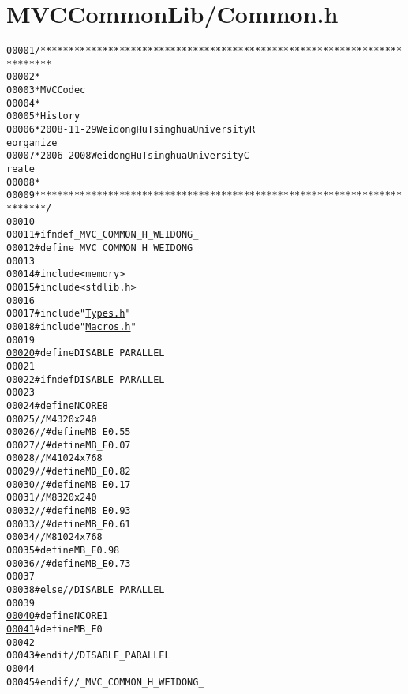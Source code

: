 \hypertarget{_common_8h_source}{
\section{MVCCommonLib/Common.h}
}


\begin{footnotesize}\begin{alltt}
00001 \textcolor{comment}{/************************************************************************}
00002 \textcolor{comment}{ *}
00003 \textcolor{comment}{ * MVC Codec}
00004 \textcolor{comment}{ * }
00005 \textcolor{comment}{ * History}
00006 \textcolor{comment}{ * 2008-11-29           Weidong Hu              Tsinghua University             R
      eorganize}
00007 \textcolor{comment}{ * 2006-2008            Weidong Hu              Tsinghua University             C
      reate}
00008 \textcolor{comment}{ * }
00009 \textcolor{comment}{ ************************************************************************/}
00010 
00011 \textcolor{preprocessor}{#ifndef \_MVC\_COMMON\_H\_WEIDONG\_}
00012 \textcolor{preprocessor}{}\textcolor{preprocessor}{#define \_MVC\_COMMON\_H\_WEIDONG\_}
00013 \textcolor{preprocessor}{}
00014 \textcolor{preprocessor}{#include <memory>}
00015 \textcolor{preprocessor}{#include <stdlib.h>}
00016 
00017 \textcolor{preprocessor}{#include "\hyperlink{_types_8h}{Types.h}"}
00018 \textcolor{preprocessor}{#include "\hyperlink{_macros_8h}{Macros.h}"}
00019 
\hypertarget{_common_8h_source_l00020}{}\hyperlink{_common_8h_aa6d7914b9c493f457af4a099a504f6a6}{00020} \textcolor{preprocessor}{#define DISABLE\_PARALLEL}
00021 \textcolor{preprocessor}{}
00022 \textcolor{preprocessor}{#ifndef DISABLE\_PARALLEL}
00023 \textcolor{preprocessor}{}
00024 \textcolor{preprocessor}{#define NCORE 8}
00025 \textcolor{preprocessor}{}\textcolor{comment}{// M4 320x240}
00026 \textcolor{comment}{//#define MB\_E 0.55}
00027 \textcolor{comment}{//#define MB\_E 0.07}
00028 \textcolor{comment}{// M4 1024x768}
00029 \textcolor{comment}{//#define MB\_E 0.82}
00030 \textcolor{comment}{//#define MB\_E 0.17}
00031 \textcolor{comment}{// M8 320x240}
00032 \textcolor{comment}{//#define MB\_E 0.93}
00033 \textcolor{comment}{//#define MB\_E 0.61}
00034 \textcolor{comment}{// M8 1024x768}
00035 \textcolor{preprocessor}{#define MB\_E 0.98}
00036 \textcolor{preprocessor}{}\textcolor{comment}{//#define MB\_E 0.73}
00037 
00038 \textcolor{preprocessor}{#else //DISABLE\_PARALLEL}
00039 \textcolor{preprocessor}{}
\hypertarget{_common_8h_source_l00040}{}\hyperlink{_common_8h_a9a53c1a7cf3eaff832fdc197520c6fc6}{00040} \textcolor{preprocessor}{#define NCORE 1}
\hypertarget{_common_8h_source_l00041}{}\hyperlink{_common_8h_a3a7c35b14731007b6847c0d57ba23d68}{00041} \textcolor{preprocessor}{}\textcolor{preprocessor}{#define MB\_E 0}
00042 \textcolor{preprocessor}{}
00043 \textcolor{preprocessor}{#endif //DISABLE\_PARALLEL}
00044 \textcolor{preprocessor}{}
00045 \textcolor{preprocessor}{#endif //\_MVC\_COMMON\_H\_WEIDONG\_}
\end{alltt}\end{footnotesize}
